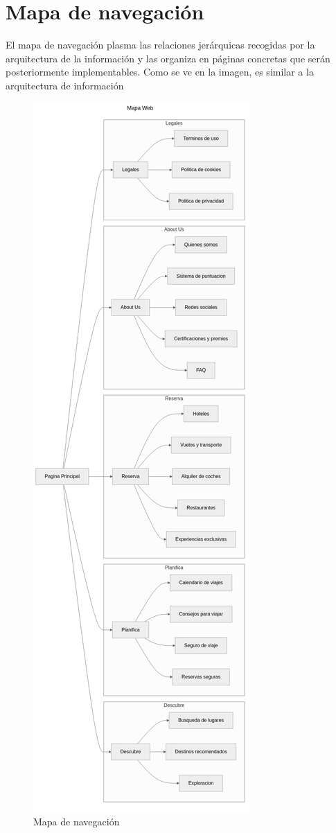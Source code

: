 \documentclass[11pt, a4paper]{book}
\begin{document}
	
	
	\section{Mapa de navegación}
	El mapa de navegación plasma las relaciones jerárquicas recogidas por la arquitectura de la información y las organiza en páginas concretas que serán posteriormente implementables. Como se ve en la imagen, es similar a la arquitectura de información
	
	\begin{figure} [H]
		\centering
		\includegraphics[height=0.85\textheight]{mapa_web.png}
		\caption{Mapa de navegación}
	\end{figure}
	
\end{document}
